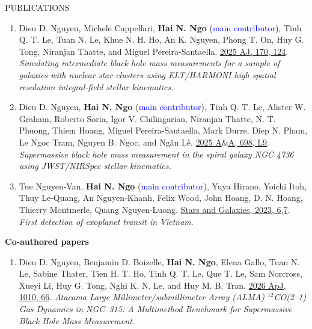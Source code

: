 \documentclass{resume} %
\begin{document}
\begin{rSection}{PUBLICATIONS}
\begin{enumerate}
\item {Dieu D. Nguyen}, Michele Cappellari, \textbf{Hai N. Ngo} (\textcolor{blue}{{main contributor}}), Tinh Q. T. Le, Tuan N. Le, Khue N. H. Ho, An K. Nguyen, Phong T. On, Huy G. Tong, Niranjan Thatte, and Miguel Pereira-Santaella. \textcolor{blue}{\href{https://doi.org/10.3847/1538-3881/ade9ba}{2025 AJ, 170, 124}}. \textit{{Simulating intermediate black hole mass measurements for a sample of galaxies with nuclear star clusters using ELT/HARMONI high spatial resolution integral-field stellar kinematics}.}

\item {Dieu D. Nguyen}, \textbf{Hai N. Ngo} (\textcolor{blue}{{main contributor}}), Tinh Q. T. Le, Alister W. Graham, Roberto Soria, Igor V. Chilingarian, Niranjan Thatte, N. T. Phuong, Thiem Hoang, Miguel Pereira-Santaella, Mark Durre, Diep N. Pham, Le Ngoc Tram, Nguyen B. Ngoc, and Ngân Lê. \textcolor{blue}{\href{https://doi.org/10.1051/0004-6361/202554672}{2025 A$\&$A, 698, L9}}. \textit{Supermassive black hole mass measurement in the spiral galaxy NGC 4736 using JWST/NIRSpec stellar kinematics.}

\item Tue Nguyen‑Van, \textbf{Hai N. Ngo} (\textcolor{blue}{{main contributor}}), Yuya Hirano, Yoichi Itoh, Thuy Le‑Quang, An Nguyen‑Khanh, Felix Wood, John Hoang, D. N. Hoang, Thierry Montmerle, Quang Nguyen‑Luong. \href{https://doi.org/10.32231/starsandgalaxies.6.0_7}{Stars and Galaxies, 2023, 6,7}. \textit{First detection of exoplanet transit in Vietnam}.

\end{enumerate}
\textbf{Co-authored papers}
\begin{enumerate}
\item {Dieu D. Nguyen}, Benjamin D. Boizelle, \textbf{Hai N. Ngo}, Elena Gallo, Tuan N. Le, Sabine Thater, Tien H. T. Ho, Tinh Q. T. Le, Que T. Le, Sam Norcross, Xueyi Li, Huy G. Tong, Nghi K. N. Le, and Huy M. B. Tran. \textcolor{blue}{\href{https://doi.org/10.3847/1538-4357/aea151}{2026 ApJ, 1010, 66}}. \textit{Atacama Large Millimeter/submillimeter Array (ALMA) $^{12}$CO(2--1) Gas Dynamics in NGC~315: A Multimethod Benchmark for Supermassive Black Hole Mass Measurement.}


\end{enumerate}
\end{rSection}
\end{document}
